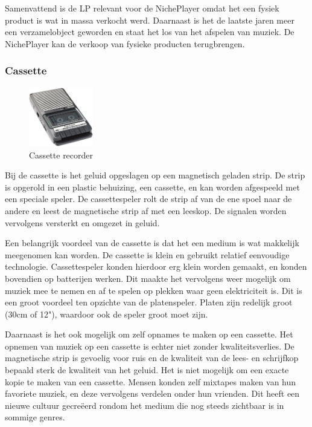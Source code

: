 Samenvattend is de LP relevant voor de NichePlayer omdat het een fysiek product is wat in massa verkocht werd. Daarnaast is het de laatste jaren meer een verzamelobject geworden en staat het los van het afspelen van muziek. De NichePlayer kan de verkoop van fysieke producten terugbrengen.

\subsubsection*{Cassette}
\begin{figure}
    \centering
    \includegraphics[width=0.25\textwidth]{assets/critical-review/Tape.jpg}
    \caption{Cassette recorder}
    \label{fig:critical-review:tape}
\end{figure}
Bij de cassette is het geluid opgeslagen op een magnetisch geladen strip. De strip is opgerold in een plastic behuizing, een cassette, en kan worden afgespeeld met een speciale speler. De cassettespeler rolt de strip af van de ene spoel naar de andere en leest de magnetische strip af met een leeskop. De signalen worden vervolgens versterkt en omgezet in geluid.

Een belangrijk voordeel van de cassette is dat het een medium is wat makkelijk meegenomen kan worden. De cassette is klein en gebruikt relatief eenvoudige technologie. Cassettespeler konden hierdoor erg klein worden gemaakt, en konden bovendien op batterijen werken. Dit maakte het vervolgens weer mogelijk om muziek mee te nemen en af te spelen op plekken waar geen elektriciteit is. Dit is een groot voordeel ten opzichte van de platenspeler. Platen zijn redelijk groot (30cm of 12"), waardoor ook de speler groot moet zijn.

Daarnaast is het ook mogelijk om zelf opnames te maken op een cassette. Het opnemen van muziek op een cassette is echter niet zonder kwaliteitsverlies. De magnetische strip is gevoelig voor ruis en de kwaliteit van de lees- en schrijfkop bepaald sterk de kwaliteit van het geluid. Het is niet mogelijk om een exacte kopie te maken van een cassette. Mensen konden zelf mixtapes maken van hun favoriete muziek, en deze vervolgens verdelen onder hun vrienden. Dit heeft een nieuwe cultuur gecreëerd rondom het medium die nog steeds zichtbaar is in sommige genres.

